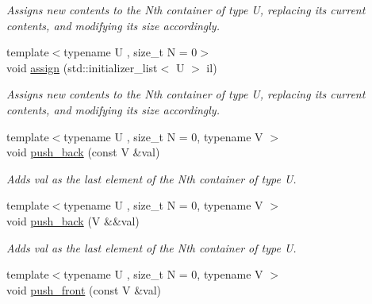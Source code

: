\begin{DoxyCompactItemize}
\begin{DoxyCompactList}\small\item\em Assigns new contents to the Nth container of type U, replacing its current contents, and modifying its size accordingly. \end{DoxyCompactList}\item 
\hypertarget{classheterogeneous_1_1heterodeque_3_01_t_00_01_types_8_8_8_4_af4be526489720cf71d2bd6c982bece6c}{}{\footnotesize template$<$typename U , size\+\_\+t N = 0$>$ }\\void \hyperlink{classheterogeneous_1_1heterodeque_3_01_t_00_01_types_8_8_8_4_af4be526489720cf71d2bd6c982bece6c}{assign} (std\+::initializer\+\_\+list$<$ U $>$ il)\label{classheterogeneous_1_1heterodeque_3_01_t_00_01_types_8_8_8_4_af4be526489720cf71d2bd6c982bece6c}

\begin{DoxyCompactList}\small\item\em Assigns new contents to the Nth container of type U, replacing its current contents, and modifying its size accordingly. \end{DoxyCompactList}\item 
\hypertarget{classheterogeneous_1_1heterodeque_3_01_t_00_01_types_8_8_8_4_a5e30d725cbc664a325627b00bd241d76}{}{\footnotesize template$<$typename U , size\+\_\+t N = 0, typename V $>$ }\\void \hyperlink{classheterogeneous_1_1heterodeque_3_01_t_00_01_types_8_8_8_4_a5e30d725cbc664a325627b00bd241d76}{push\+\_\+back} (const V \&val)\label{classheterogeneous_1_1heterodeque_3_01_t_00_01_types_8_8_8_4_a5e30d725cbc664a325627b00bd241d76}

\begin{DoxyCompactList}\small\item\em Adds val as the last element of the Nth container of type U. \end{DoxyCompactList}\item 
\hypertarget{classheterogeneous_1_1heterodeque_3_01_t_00_01_types_8_8_8_4_a9f9813935b080444dd93c571f32859eb}{}{\footnotesize template$<$typename U , size\+\_\+t N = 0, typename V $>$ }\\void \hyperlink{classheterogeneous_1_1heterodeque_3_01_t_00_01_types_8_8_8_4_a9f9813935b080444dd93c571f32859eb}{push\+\_\+back} (V \&\&val)\label{classheterogeneous_1_1heterodeque_3_01_t_00_01_types_8_8_8_4_a9f9813935b080444dd93c571f32859eb}

\begin{DoxyCompactList}\small\item\em Adds val as the last element of the Nth container of type U. \end{DoxyCompactList}\item 
\hypertarget{classheterogeneous_1_1heterodeque_3_01_t_00_01_types_8_8_8_4_a3525f25cb699dd6cadbc48283a9b69ac}{}{\footnotesize template$<$typename U , size\+\_\+t N = 0, typename V $>$ }\\void \hyperlink{classheterogeneous_1_1heterodeque_3_01_t_00_01_types_8_8_8_4_a3525f25cb699dd6cadbc48283a9b69ac}{push\+\_\+front} (const V \&val)\label{classheterogeneous_1_1heterodeque_3_01_t_00_01_types_8_8_8_4_a3525f25cb699dd6cadbc48283a9b69ac}


\end{DoxyCompactItemize}
